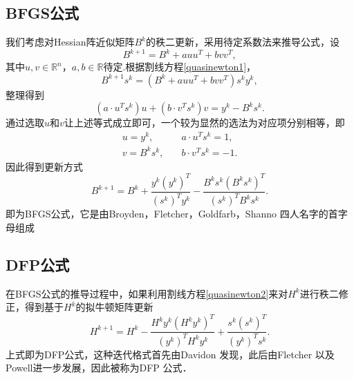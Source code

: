 \subsection{BFGS公式}
我们考虑对Hessian阵近似矩阵$B^k$的秩二更新，采用待定系数法来推导公式，设
\begin{equation}
	B^{k+1} = B^k + auu^T+bvv^T,
\end{equation}
其中$u, v\in\mathbb{R}^n$，$a, b\in \mathbb{R}$待定.根据割线方程\eqref{quasinewton1}，
\begin{equation*}
	B^{k+1}s^k = (B^k + auu^T+bvv^T)s^k  y^k,
\end{equation*}
整理得到
\begin{equation*}
	(a\cdot u^Ts^k)u + (b\cdot v^Ts^k)v = y^k-B^ks^k.
\end{equation*}
通过选取$u$和$v$让上述等式成立即可，一个较为显然的选法为对应项分别相等，即
\begin{equation*}
	\begin{split}
		u = y^k,\quad &a\cdot u^Ts^k = 1,\\
		v = B^ks^k,\quad & b\cdot v^Ts^k = -1.
	\end{split}
\end{equation*}
因此得到更新方式
\begin{equation}
	B^{k+1} = B^k+\frac{y^k(y^k)^T}{(s^k)^Ty^k} - \frac{B^ks^k(B^ks^k)^T}{(s^k)^TB^ks^k}.
\end{equation}
即为BFGS公式，它是由Broyden，Fletcher，Goldfarb，Shanno 四人名字的首字母组成
\subsection{DFP公式}
在BFGS公式的推导过程中，如果利用割线方程\eqref{quasinewton2}来对$H^k$进行秩二修正，得到基于$H^k$的拟牛顿矩阵更新
\begin{equation}
	H^{k+1} = H^k-\frac{H^ky^k(H^ky^k)^T}{(y^k)^TH^ky^k}+\frac{s^k(s^k)^T}{(y^k)^Ts^k}.
\end{equation}
上式即为DFP公式，这种迭代格式首先由Davidon 发现，此后由Fletcher 以及Powell进一步发展，因此被称为DFP 公式．